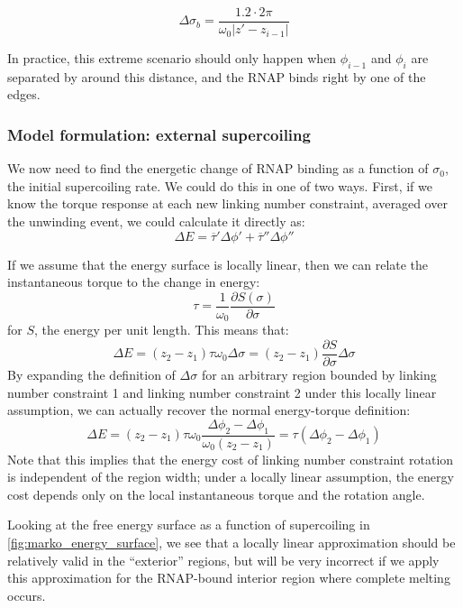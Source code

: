 \documentclass[11pt]{article}
\begin{document}
\begin{equation}
\Delta \sigma_b = \frac{1.2 \cdot 2 \pi}{\omega_0 |z' - z_{i-1}|}
\end{equation}


In practice, this extreme scenario should only happen when \(\phi_{i-1}\) and \(\phi_i\) are separated by around this distance, and the RNAP binds right by one of the edges.

\subsubsection{Model formulation: external supercoiling}
We now need to find the energetic change of RNAP binding as a function of \(\sigma_0\), the initial supercoiling rate. We could do this in one of two ways. First, if we know the torque response at each new linking number constraint, averaged over the unwinding event, we could calculate it directly as:
\begin{equation}
    \Delta E = \overline \tau' \Delta \phi' + \overline \tau'' \Delta \phi''
    \label{eq:direct_torque_calc}
\end{equation}

If we assume that the energy surface is locally linear, then we can relate the instantaneous torque to the change in energy:
\[ \tau = \frac{1}{\omega_0} \frac{\partial S(\sigma)}{\partial \sigma}\]
for \(S\), the energy per unit length. This means that:
\begin{equation}
    \Delta E = (z_2 - z_1) \tau \omega_0 \Delta \sigma = (z_2 - z_1) \frac{\partial S}{\partial \sigma} \Delta \sigma
\end{equation}
By expanding the definition of \(\Delta \sigma\) for an arbitrary region bounded by linking number constraint 1 and linking number constraint 2 under this locally linear assumption, we can actually recover the normal energy-torque definition:
\[\Delta E = (z_2 - z_1) \tau \omega_0 \frac{\Delta\phi_2 - \Delta\phi_1}{\omega_0 (z_2 - z_1)} = \tau (\Delta \phi_2 - \Delta\phi_1)\]
Note that this implies that the energy cost of linking number constraint rotation is independent of the region width; under a locally linear assumption, the energy cost depends only on the local instantaneous torque and the rotation angle.

Looking at the free energy surface as a function of supercoiling in \autoref{fig:marko_energy_surface}, we see that a locally linear approximation should be relatively valid in the  ``exterior'' regions, but will be very incorrect if we apply this approximation for the RNAP-bound interior region where complete melting occurs.
\end{document}
